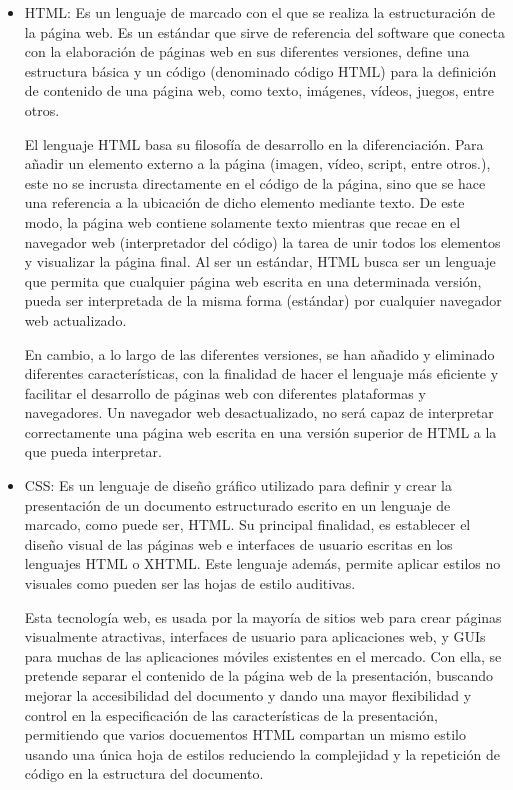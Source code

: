 \begin{itemize}
\item HTML: Es un lenguaje de marcado con el que se realiza la estructuración de la página web. Es un estándar que sirve de referencia del software que conecta con la elaboración de páginas web en sus diferentes versiones, define una estructura básica y un código (denominado código HTML) para la definición de contenido de una página web, como texto, imágenes, vídeos, juegos, entre otros. 

El lenguaje HTML basa su filosofía de desarrollo en la diferenciación. Para añadir un elemento externo a la página (imagen, vídeo, script, entre otros.), este no se incrusta directamente en el código de la página, sino que se hace una referencia a la ubicación de dicho elemento mediante texto. De este modo, la página web contiene solamente texto mientras que recae en el navegador web (interpretador del código) la tarea de unir todos los elementos y visualizar la página final. Al ser un estándar, HTML busca ser un lenguaje que permita que cualquier página web escrita en una determinada versión, pueda ser interpretada de la misma forma (estándar) por cualquier navegador web actualizado.

En cambio, a lo largo de las diferentes versiones, se han añadido y eliminado diferentes características, con la finalidad de hacer el lenguaje más eficiente y facilitar el desarrollo de páginas web con diferentes plataformas y navegadores. Un navegador web  desactualizado, no será capaz de interpretar correctamente una página web escrita en una versión superior de HTML a la que pueda interpretar.  

\item CSS: Es un lenguaje de diseño gráfico utilizado para definir y crear la presentación de un documento estructurado escrito en un lenguaje de marcado, como puede ser, HTML. Su principal finalidad, es establecer el diseño visual de las páginas web e interfaces de usuario escritas en los lenguajes HTML o XHTML. Este lenguaje además, permite aplicar estilos no visuales como pueden ser las hojas de estilo auditivas.

Esta tecnología web, es usada por la mayoría de sitios web para crear páginas visualmente atractivas, interfaces de usuario para aplicaciones web, y GUIs para muchas de las aplicaciones móviles existentes en el mercado. Con ella, se pretende separar el contenido de la página web de la presentación, buscando mejorar la accesibilidad del documento y dando una mayor flexibilidad y control en la especificación de las características de la presentación, permitiendo que varios docuementos HTML compartan un mismo estilo usando una única hoja de estilos reduciendo la complejidad y la repetición de código en la estructura del documento.


\end{itemize}
